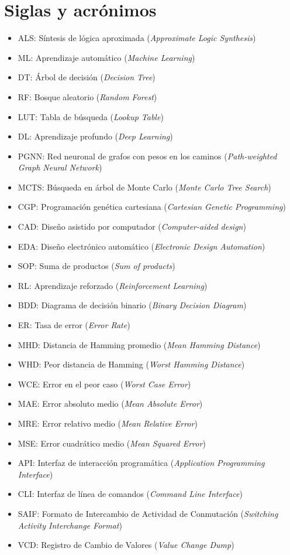 \chapter*{Siglas y acrónimos}

\begin{itemize}
  \item ALS: Síntesis de lógica aproximada (\emph{Approximate Logic Synthesis})
  \item ML: Aprendizaje automático (\emph{Machine Learning})
  \item DT: Árbol de decisión (\emph{Decision Tree})
  \item RF: Bosque aleatorio (\emph{Random Forest})
  \item LUT: Tabla de búsqueda (\emph{Lookup Table})
  \item DL: Aprendizaje profundo (\emph{Deep Learning})
  \item PGNN: Red neuronal de grafos con pesos en los caminos (\emph{Path-weighted Graph Neural Network})
  \item MCTS: Búsqueda en árbol de Monte Carlo (\emph{Monte Carlo Tree Search})
  \item CGP: Programación genética cartesiana (\emph{Cartesian Genetic Programming})
  \item CAD: Diseño asistido por computador (\emph{Computer-aided design})
  \item EDA: Diseño electrónico automático (\emph{Electronic Design Automation})
  \item SOP: Suma de productos (\emph{Sum of products})
  \item RL: Aprendizaje reforzado (\emph{Reinforcement Learning})
  \item BDD: Diagrama de decisión binario (\emph{Binary Decision Diagram})
  \item ER: Tasa de error (\emph{Error Rate})
  \item MHD: Distancia de Hamming promedio (\emph{Mean Hamming Distance})
  \item WHD: Peor distancia de Hamming (\emph{Worst Hamming Distance})
  \item WCE: Error en el peor caso (\emph{Worst Case Error})
  \item MAE: Error absoluto medio (\emph{Mean Absolute Error})
  \item MRE: Error relativo medio (\emph{Mean Relative Error})
  \item MSE: Error cuadrático medio (\emph{Mean Squared Error})
  \item API: Interfaz de interacción programática (\emph{Application Programming Interface})
  \item CLI: Interfaz de línea de comandos (\emph{Command Line Interface})
  \item SAIF: Formato de Intercambio de Actividad de Conmutación (\emph{Switching Activity Interchange Format})
  \item VCD: Registro de Cambio de Valores (\emph{Value Change Dump})
\end{itemize}
